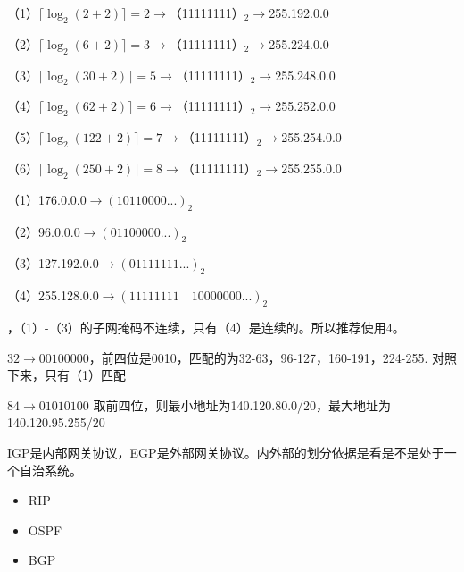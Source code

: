 \documentclass{ctexart}
\begin{document}
    （1）$\lceil\log_2(2+2) \rceil=2$$\rightarrow$（11111111）$_2\rightarrow$255.192.0.0

    （2）$\lceil\log_2(6+2) \rceil=3$$\rightarrow$（11111111）$_2\rightarrow$255.224.0.0

    （3）$\lceil\log_2(30+2) \rceil=5$$\rightarrow$（11111111）$_2\rightarrow$255.248.0.0

    （4）$\lceil\log_2(62+2) \rceil=6$$\rightarrow$（11111111）$_2\rightarrow$255.252.0.0

    （5）$\lceil\log_2(122+2) \rceil=7$$\rightarrow$（11111111）$_2\rightarrow$255.254.0.0

    （6）$\lceil\log_2(250+2) \rceil=8$$\rightarrow$（11111111）$_2\rightarrow$255.255.0.0


    \answer[4-25]
    （1）176.0.0.0$\rightarrow (10110000...)_2$

    \quad（2）96.0.0.0$\rightarrow (01100000...)_2$

    \quad（3）127.192.0.0$\rightarrow (01111111...)_2$

    \quad（4）255.128.0.0$\rightarrow (11111111\quad 10000000...)_2$

    ，（1）-（3）的子网掩码不连续，只有（4）是连续的。所以推荐使用4。
    
    \answer[4-31]
    $32\rightarrow 00100000$，前四位是0010，匹配的为32-63，96-127，160-191，224-255.
    对照下来，只有（1）匹配

    \answer[4-35]
    $84\rightarrow 01010100$ 取前四位，则最小地址为140.120.80.0/20，最大地址为140.120.95.255/20

    \answer[4-38]
    IGP是内部网关协议，EGP是外部网关协议。内外部的划分依据是看是不是处于一个自治系统。

    \answer[4-39]
    \begin{itemize}
        \item RIP
        \item OSPF
        \item BGP
    \end{itemize}

    \answer[4-43]


    \answer[4-48]


    \answer[4-65]
\end{document}

